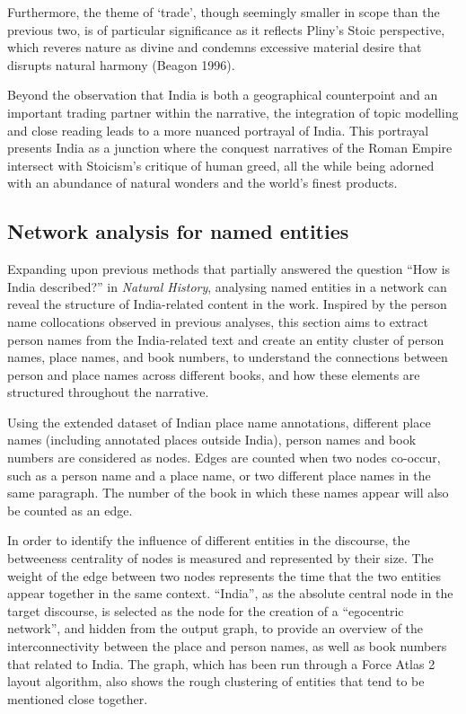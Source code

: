 \documentclass[
  12pt,
]{article}
\begin{document}
Furthermore, the theme of `trade', though seemingly smaller in scope
than the previous two, is of particular significance as it reflects
Pliny's Stoic perspective, which reveres nature as divine and condemns
excessive material desire that disrupts natural harmony (Beagon 1996).

Beyond the observation that India is both a geographical counterpoint
and an important trading partner within the narrative, the integration
of topic modelling and close reading leads to a more nuanced portrayal
of India. This portrayal presents India as a junction where the conquest
narratives of the Roman Empire intersect with Stoicism's critique of
human greed, all the while being adorned with an abundance of natural
wonders and the world's finest products.

\hypertarget{sec-network}{%
\subsection{Network analysis for named entities}\label{sec-network}}

Expanding upon previous methods that partially answered the question
``How is India described?'' in \emph{Natural History}, analysing named
entities in a network can reveal the structure of India-related content
in the work. Inspired by the person name collocations observed in
previous analyses, this section aims to extract person names from the
India-related text and create an entity cluster of person names, place
names, and book numbers, to understand the connections between person
and place names across different books, and how these elements are
structured throughout the narrative.

Using the extended dataset of Indian place name annotations, different
place names (including annotated places outside India), person names and
book numbers are considered as nodes. Edges are counted when two nodes
co-occur, such as a person name and a place name, or two different place
names in the same paragraph. The number of the book in which these names
appear will also be counted as an edge.

In order to identify the influence of different entities in the
discourse, the betweeness centrality of nodes is measured and
represented by their size. The weight of the edge between two nodes
represents the time that the two entities appear together in the same
context. ``India'', as the absolute central node in the target
discourse, is selected as the node for the creation of a ``egocentric
network'', and hidden from the output graph, to provide an overview of
the interconnectivity between the place and person names, as well as
book numbers that related to India. The graph, which has been run
through a Force Atlas 2 layout algorithm, also shows the rough
clustering of entities that tend to be mentioned close together.
\end{document}
